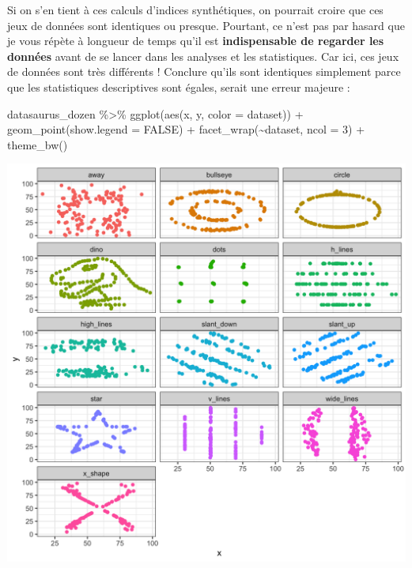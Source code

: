 \documentclass[
  a4paper,
]{article}
\newenvironment{Shaded}{\begin{snugshade}}{\end{snugshade}}
\newcommand{\AttributeTok}[1]{\textcolor[rgb]{0.00,0.34,0.68}{#1}}
\newcommand{\ConstantTok}[1]{\textcolor[rgb]{0.67,0.33,0.00}{#1}}
\newcommand{\DecValTok}[1]{\textcolor[rgb]{0.69,0.50,0.00}{#1}}
\newcommand{\FunctionTok}[1]{\textcolor[rgb]{0.39,0.29,0.61}{#1}}
\newcommand{\NormalTok}[1]{\textcolor[rgb]{0.12,0.11,0.11}{#1}}
\newcommand{\SpecialCharTok}[1]{\textcolor[rgb]{0.24,0.68,0.91}{#1}}
\begin{document}
Si on s'en tient à ces calculs d'indices synthétiques, on pourrait croire que ces jeux de données sont identiques ou presque. Pourtant, ce n'est pas par hasard que je vous répète à longueur de temps qu'il est \textbf{indispensable de regarder les données} avant de se lancer dans les analyses et les statistiques. Car ici, ces jeux de données sont très différents ! Conclure qu'ils sont identiques simplement parce que les statistiques descriptives sont égales, serait une erreur majeure :

\begin{Shaded}
\begin{Highlighting}[]
\NormalTok{datasaurus\_dozen }\SpecialCharTok{\%\textgreater{}\%} 
  \FunctionTok{ggplot}\NormalTok{(}\FunctionTok{aes}\NormalTok{(x, y, }\AttributeTok{color =}\NormalTok{ dataset)) }\SpecialCharTok{+}
  \FunctionTok{geom\_point}\NormalTok{(}\AttributeTok{show.legend =} \ConstantTok{FALSE}\NormalTok{) }\SpecialCharTok{+}
  \FunctionTok{facet\_wrap}\NormalTok{(}\SpecialCharTok{\textasciitilde{}}\NormalTok{dataset, }\AttributeTok{ncol =} \DecValTok{3}\NormalTok{) }\SpecialCharTok{+}
  \FunctionTok{theme\_bw}\NormalTok{()}
\end{Highlighting}
\end{Shaded}

\begin{center}\includegraphics[width=0.9\linewidth]{figure/unnamed-chunk-125-1} \end{center}
\end{document}
